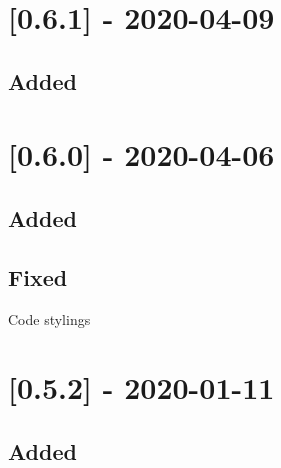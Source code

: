 \section{[0.6.1] - 2020-04-09}

\subsection{Added}

\begin{shortlist}
    \item {}
    \item {}
    \item {}
\end{shortlist}

\section{[0.6.0] - 2020-04-06}

\subsection{Added}

\begin{shortlist}
    \item {}
    \item {}
    \item {}
    \item {}
    \item {}
\end{shortlist}

\subsection{Fixed}

\begin{shortlist}
    \item Code stylings
\end{shortlist}

\section{[0.5.2] - 2020-01-11}

\subsection{Added}

